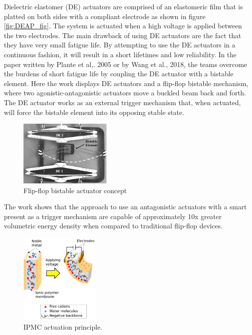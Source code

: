 Dielectric elastomer (DE) actuators are comprised of an elastomeric film that is platted on both sides with a compliant electrode as shown in figure \ref{fig:DEAP_fig}. The system is actuated when a high voltage is applied between the two electrodes. The main drawback of using DE actuators are the fact that they have very small fatigue life. By attempting to use the DE actuators in a continuous fashion, it will result in a short lifetimes and low reliability. In the paper written by Plante et al,. 2005\cite{plante_properties_2007,chouinard_bistable_2012} or by Wang et al., 2018\cite{wang_design_2018}, the teams overcome the burdens of short fatigue life by coupling the DE actuator with a bistable element. Here the work displays DE actuators and a flip-flop bistable mechanism, where two agonistic-antagonistic actuators move a buckled beam back and forth. The DE actuator works as an external trigger mechanism that, when actuated, will force the bistable element into its opposing stable state.
\begin{figure}[H]
	\centering
	\includegraphics[width=0.4\textwidth]{Figures/DEAP_flipflop.png}
	\caption{Flip-flop bistable actuator concept\cite{plante_compliant_2005}}
	\label{fig:DEAP_flipflop}
\end{figure}

The work shows that the approach to use an antagonistic actuators with a smart present as a trigger mechanism are capable of approximately 10x greater volumetric energy density when compared to traditional flip-flop devices.\\

\begin{figure}
	\centering
	\vspace{-20pt}
	\includegraphics[width=0.35\textwidth]{Figures/IPMC_fig.png}
	\caption{IPMC actuation principle\cite{poubel_proposal_2011}.}
	\vspace{-15pt}
	\label{fig:IPMC_act}
\end{figure}


